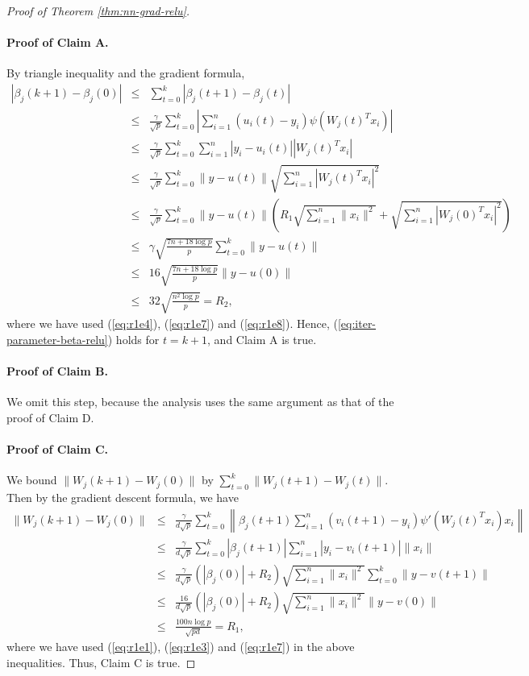 \begin{proof}[Proof of Theorem \ref{thm:nn-grad-relu}]
\paragraph{Proof of Claim A.}
By triangle inequality and the gradient formula,
\begin{eqnarray*}
|\beta_j(k+1)-\beta_j(0)| &\leq& \sum_{t=0}^k|\beta_j(t+1)-\beta_j(t)| \\
&\leq& \frac{\gamma}{\sqrt{p}}\sum_{t=0}^k\left|\sum_{i=1}^n(u_i(t)-y_i)\psi(W_j(t)^Tx_i)\right| \\
&\leq& \frac{\gamma}{\sqrt{p}}\sum_{t=0}^k\sum_{i=1}^n|y_i-u_i(t)||W_j(t)^Tx_i| \\
&\leq& \frac{\gamma}{\sqrt{p}}\sum_{t=0}^k\|y-u(t)\|\sqrt{\sum_{i=1}^n|W_j(t)^Tx_i|^2} \\
&\leq& \frac{\gamma}{\sqrt{p}}\sum_{t=0}^k\|y-u(t)\|\left(R_1\sqrt{\sum_{i=1}^n\|x_i\|^2}+\sqrt{\sum_{i=1}^n|W_j(0)^Tx_i|^2}\right) \\
&\leq& \gamma\sqrt{\frac{7n+18\log p}{p}}\sum_{t=0}^k\|y-u(t)\| \\
&\leq& 16\sqrt{\frac{7n+18\log p}{p}}\|y-u(0)\| \\
&\leq& 32\sqrt{\frac{n^2\log p}{p}} = R_2,
\end{eqnarray*}
where we have used (\ref{eq:r1e4}), (\ref{eq:r1e7}) and (\ref{eq:r1e8}).
Hence, (\ref{eq:iter-parameter-beta-relu}) holds for $t=k+1$, and Claim A is true.

\paragraph{Proof of Claim B.} We omit this step, because the analysis uses the same argument as that of the proof of Claim D.

\paragraph{Proof of Claim C.} We bound $\|W_j(k+1)-W_j(0)\|$ by $\sum_{t=0}^k\|W_j(t+1)-W_j(t)\|$. Then by the gradient descent formula, we have
\begin{eqnarray*}
\|W_j(k+1)-W_j(0)\| &\leq& \frac{\gamma}{d\sqrt{p}}\sum_{t=0}^k\left\|\beta_j(t+1)\sum_{i=1}^n(v_i(t+1)-y_i)\psi'(W_j(t)^Tx_i)x_i\right\| \\
&\leq& \frac{\gamma}{d\sqrt{p}}\sum_{t=0}^k|\beta_j(t+1)|\sum_{i=1}^n|y_i-v_i(t+1)|\|x_i\| \\
&\leq& \frac{\gamma}{d\sqrt{p}}(|\beta_j(0)|+R_2)\sqrt{\sum_{i=1}^n\|x_i\|^2}\sum_{t=0}^k\|y-v(t+1)\| \\
&\leq& \frac{16}{d\sqrt{p}}(|\beta_j(0)|+R_2)\sqrt{\sum_{i=1}^n\|x_i\|^2}\|y-v(0)\| \\
&\leq& \frac{100n\log p}{\sqrt{pd}} = R_1,
\end{eqnarray*}
where we have used (\ref{eq:r1e1}), (\ref{eq:r1e3}) and (\ref{eq:r1e7}) in the above inequalities. Thus, Claim C is true.


\end{proof}
